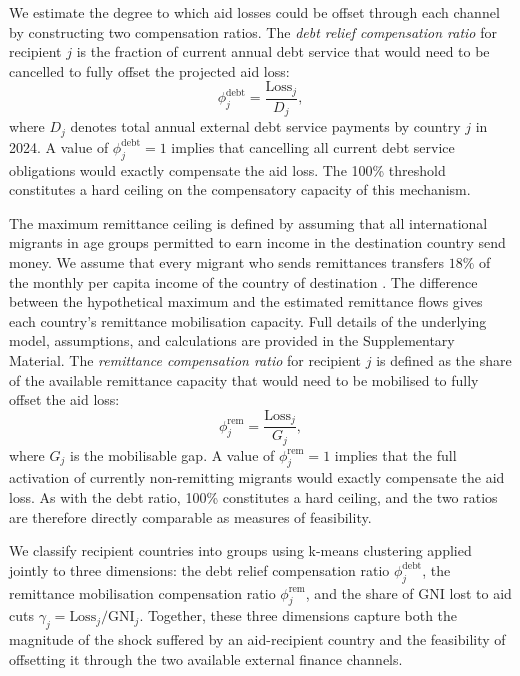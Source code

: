 \documentclass[fleqn,10pt,twocolumn]{wlscirep}
\begin{document}
We estimate the degree to which aid losses could be offset through each channel by constructing two compensation ratios. The \textit{debt relief compensation ratio} for recipient $j$ is the fraction of current annual debt service that would need to be cancelled to fully offset the projected aid loss:
\begin{equation}
    \phi_j^{\text{debt}} = \frac{\text{Loss}_j}{D_j},
    \label{eq:debt_comp}
\end{equation}
where $D_j$ denotes total annual external debt service payments by country $j$ in 2024. A value of $\phi_j^{\text{debt}} = 1$ implies that cancelling all current debt service obligations would exactly compensate the aid loss. The 100\% threshold constitutes a hard ceiling on the compensatory capacity of this mechanism.

The maximum remittance ceiling is defined by assuming that all international migrants in age groups permitted to earn income in the destination country send money. We assume that every migrant who sends remittances transfers $18\%$ of the monthly per capita income of the country of destination \cite{vismara2025migrants}. The difference between the hypothetical maximum and the estimated remittance flows gives each country's remittance mobilisation capacity. Full details of the underlying model, assumptions, and calculations are provided in the Supplementary Material. The \textit{remittance compensation ratio} for recipient $j$ is defined as the share of the available remittance capacity that would need to be mobilised to fully offset the aid loss:
\begin{equation}
    \phi_j^{\text{rem}} = \frac{\text{Loss}_j}{G_j},
    \label{eq:rem_comp}
\end{equation}
where $G_j$ is the mobilisable gap. A value of $\phi_j^{\text{rem}} = 1$ implies that the full activation of currently non-remitting migrants would exactly compensate the aid loss. As with the debt ratio, 100\% constitutes a hard ceiling, and the two ratios are therefore directly comparable as measures of feasibility.

We classify recipient countries into groups using k-means clustering applied jointly to three dimensions: the debt relief compensation ratio $\phi_j^{\text{debt}}$, the remittance mobilisation compensation ratio $\phi_j^{\text{rem}}$, and the share of GNI lost to aid cuts $\gamma_j = \text{Loss}_j / \text{GNI}_j$. Together, these three dimensions capture both the magnitude of the shock suffered by an aid-recipient country and the feasibility of offsetting it through the two available external finance channels.
\end{document}
